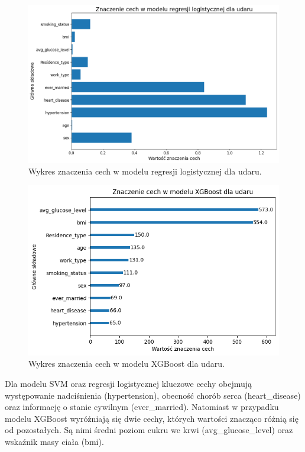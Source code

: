 \documentclass[onecolumn,12pt]{article}
\begin{document}
\begin{figure}[H]
    \centering
    \includegraphics[width=0.90\linewidth]{raport/graphs/udar_regresja.png}
    \captionsetup{justification=centering}
    \caption{Wykres znaczenia cech w modelu regresji logistycznej dla udaru.}
\end{figure}

\begin{figure}[H]
    \centering
    \includegraphics[width=0.90\linewidth]{raport/graphs/udar_xgb.png}
    \captionsetup{justification=centering}
    \caption{Wykres znaczenia cech w modelu XGBoost dla udaru.}
\end{figure}

\noindent
Dla modelu SVM oraz regresji logistycznej kluczowe cechy obejmują występowanie nadciśnienia (hypertension), obecność chorób serca (heart\_disease) oraz informację o stanie cywilnym (ever\_married). Natomiast w przypadku modelu XGBoost wyróżniają się dwie cechy, których wartości znacząco różnią się od pozostałych. Są nimi średni poziom cukru we krwi (avg\_glucose\_level) oraz wskaźnik masy ciała (bmi).
\end{document}
